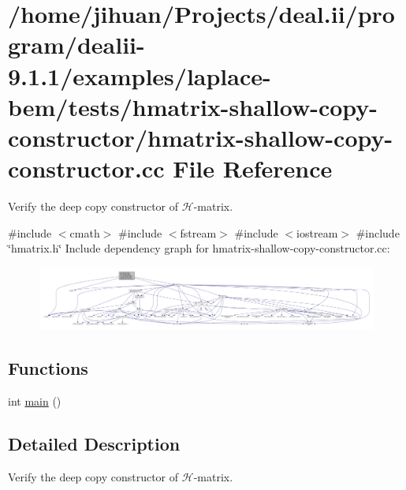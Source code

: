 \hypertarget{hmatrix-shallow-copy-constructor_8cc}{}\section{/home/jihuan/\+Projects/deal.ii/program/dealii-\/9.1.1/examples/laplace-\/bem/tests/hmatrix-\/shallow-\/copy-\/constructor/hmatrix-\/shallow-\/copy-\/constructor.cc File Reference}
\label{hmatrix-shallow-copy-constructor_8cc}


Verify the deep copy constructor of $\mathcal{H}$-\/matrix.  


{\ttfamily \#include $<$cmath$>$}\newline
{\ttfamily \#include $<$fstream$>$}\newline
{\ttfamily \#include $<$iostream$>$}\newline
{\ttfamily \#include \char`\"{}hmatrix.\+h\char`\"{}}\newline
Include dependency graph for hmatrix-\/shallow-\/copy-\/constructor.cc\+:
\nopagebreak
\begin{figure}[H]
\begin{center}
\leavevmode
\includegraphics[width=350pt]{hmatrix-shallow-copy-constructor_8cc__incl}
\end{center}
\end{figure}
\subsection*{Functions}
\begin{DoxyCompactItemize}
\item 
int \hyperlink{hmatrix-shallow-copy-constructor_8cc_ae66f6b31b5ad750f1fe042a706a4e3d4}{main} ()
\end{DoxyCompactItemize}


\subsection{Detailed Description}
Verify the deep copy constructor of $\mathcal{H}$-\/matrix. 

